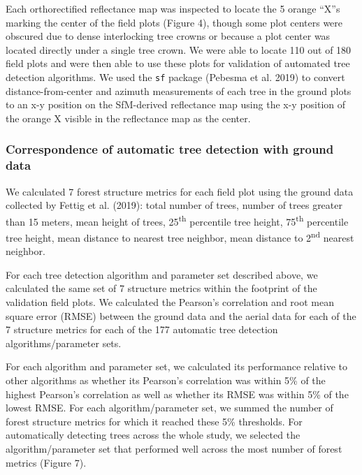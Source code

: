 \documentclass[]{article}
\begin{document}
Each orthorectified reflectance map was inspected to locate the 5 orange
``X''s marking the center of the field plots (Figure 4), though some
plot centers were obscured due to dense interlocking tree crowns or
because a plot center was located directly under a single tree crown. We
were able to locate 110 out of 180 field plots and were then able to use
these plots for validation of automated tree detection algorithms. We
used the \texttt{sf} package (Pebesma et al. 2019) to convert
distance-from-center and azimuth measurements of each tree in the ground
plots to an x-y position on the SfM-derived reflectance map using the
x-y position of the orange X visible in the reflectance map as the
center.

\subsubsection{Correspondence of automatic tree detection with ground
data}\label{correspondence-of-automatic-tree-detection-with-ground-data}

We calculated 7 forest structure metrics for each field plot using the
ground data collected by Fettig et al. (2019): total number of trees,
number of trees greater than 15 meters, mean height of trees,
25\textsuperscript{th} percentile tree height, 75\textsuperscript{th}
percentile tree height, mean distance to nearest tree neighbor, mean
distance to 2\textsuperscript{nd} nearest neighbor.

For each tree detection algorithm and parameter set described above, we
calculated the same set of 7 structure metrics within the footprint of
the validation field plots. We calculated the Pearson's correlation and
root mean square error (RMSE) between the ground data and the aerial
data for each of the 7 structure metrics for each of the 177 automatic
tree detection algorithms/parameter sets.

For each algorithm and parameter set, we calculated its performance
relative to other algorithms as whether its Pearson's correlation was
within 5\% of the highest Pearson's correlation as well as whether its
RMSE was within 5\% of the lowest RMSE. For each algorithm/parameter
set, we summed the number of forest structure metrics for which it
reached these 5\% thresholds. For automatically detecting trees across
the whole study, we selected the algorithm/parameter set that performed
well across the most number of forest metrics (Figure 7).
\end{document}
